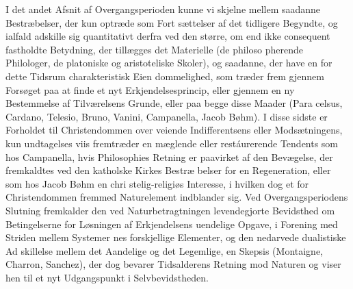 \documentclass[12pt,a4paper]{book}
\begin{document}
I det andet Afsnit af Overgangsperioden kunne vi skjelne
mellem saadanne Bestræbelser, der kun optræde som Fort\-%
sættelser af det tidligere Begyndte, og ialfald adskille sig
quantitativt derfra ved den større, om end ikke consequent
fastholdte Betydning, der tillægges det Materielle (de philoso\-%
pherende Philologer, de platoniske og aristoteliske Skoler), og
saadanne, der have en for dette Tidsrum charakteristisk Eien\-%
dommelighed, som træder frem gjennem Forsøget paa at finde
et nyt Erkjendelsesprincip, eller gjennem en ny Bestemmelse
af Tilværelsens Grunde, eller paa begge disse Maader (Para\-%
celsus, Cardano, Telesio, Bruno, Vanini, Campanella, Jacob
Bøhm). I disse sidste er Forholdet til Christendommen over\-%
veiende Indifferentsens eller Modsætningens, kun undtagelses\-%
viis fremtræder en mæglende eller restáurerende Tendents som
hos Campanella, hvis Philosophies Retning er paavirket af den
Bevægelse, der fremkaldtes ved den katholske Kirkes Bestræ\-%
belser for en Regeneration, eller som hos Jacob Bøhm en chri\-%
stelig-religiøs Interesse, i hvilken dog et for Christendommen
fremmed Naturelement indblander sig. Ved Overgangsperiodens
Slutning fremkalder den ved Naturbetragtningen levendegjorte
Bevidsthed om Betingelserne for Løsningen af Erkjendelsens
uendelige Opgave, i Forening med Striden mellem Systemer\-%
nes forskjellige Elementer, og den nedarvede dualistiske Ad\-%
skillelse mellem det Aandelige og det Legemlige, en Skepsis
(Montaigne, Charron, Sanchez), der dog bevarer Tidsalderens
Retning mod Naturen og viser hen til et nyt Udgangspunkt i
Selvbevidstheden.
\end{document}

